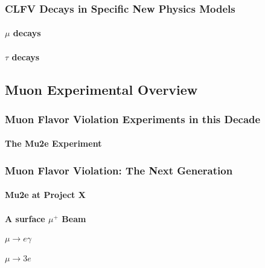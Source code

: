 \subsubsection{CLFV Decays in Specific New Physics Models}


\paragraph{$\mu$ decays}

\paragraph{$\tau$ decays}

\subsection{Muon Experimental Overview}\label{sec:cl:muexp}

\subsubsection{Muon Flavor Violation Experiments in this Decade}
\paragraph{The Mu2e Experiment}


\subsubsection{Muon Flavor Violation: The Next Generation}

\paragraph{Mu2e at Project X}


\paragraph{A surface $\mu^+$ Beam}


\paragraph{$\mu \to e \gamma$}


\paragraph{$\mu \to 3e$}


